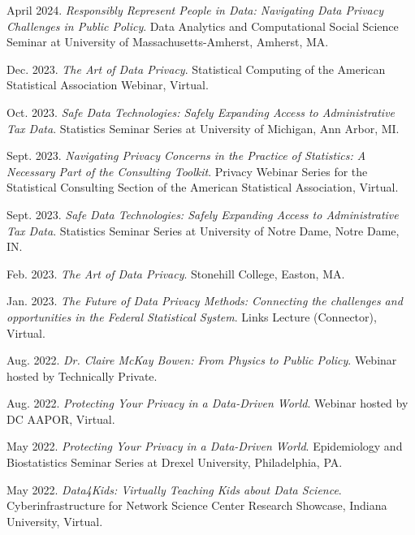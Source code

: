 \begin{etaremune}[topsep=0pt, itemsep=4pt, partopsep=0pt, parsep=0pt]
    \item April 2024. \textit{Responsibly Represent People in Data: Navigating Data Privacy Challenges in Public Policy}.  Data Analytics and Computational Social Science Seminar at University of Massachusetts-Amherst, Amherst, MA.
    
    \item Dec. 2023. \textit{The Art of Data Privacy}. Statistical Computing of the American Statistical Association Webinar, Virtual.

    \item Oct. 2023. \textit{Safe Data Technologies: Safely Expanding Access to Administrative Tax Data}. Statistics Seminar Series at University of Michigan, Ann Arbor, MI.

    \item Sept. 2023. \textit{Navigating Privacy Concerns in the Practice of Statistics: A Necessary Part of the Consulting Toolkit}. Privacy Webinar Series for the Statistical Consulting Section of the American Statistical Association, Virtual.    
    
    \item Sept. 2023. \textit{Safe Data Technologies: Safely Expanding Access to Administrative Tax Data}. Statistics Seminar Series at University of Notre Dame, Notre Dame, IN.
    
    \item Feb. 2023. \textit{The Art of Data Privacy}. Stonehill College, Easton, MA.
    
    \item Jan. 2023. \textit{The Future of Data Privacy Methods: Connecting the challenges and opportunities in the Federal Statistical System}. Links Lecture (Connector), Virtual.
    
    \item Aug. 2022. \textit{Dr. Claire McKay Bowen: From Physics to Public Policy}. Webinar hosted by Technically Private.
    
    \item Aug. 2022. \textit{Protecting Your Privacy in a Data-Driven World}. Webinar hosted by DC AAPOR, Virtual.
    
    \item May 2022. \textit{Protecting Your Privacy in a Data-Driven World}. Epidemiology and Biostatistics Seminar Series at Drexel University, Philadelphia, PA.
    
    \item May 2022. \textit{Data4Kids: Virtually Teaching Kids about Data Science}. Cyberinfrastructure for Network Science Center Research Showcase, Indiana University, Virtual.
    

\end{etaremune}

